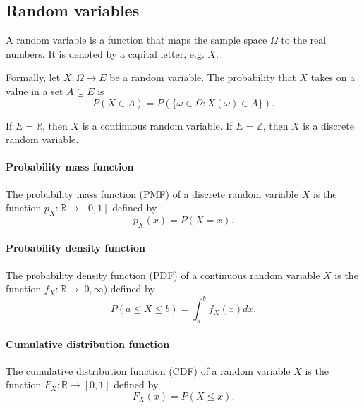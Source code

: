\subsection{Random variables}

A random variable is a function that maps the sample space $\Omega$ to the real
numbers.  It is denoted by a capital letter, e.g. $X$.

Formally, let $X : \Omega \rightarrow E$ be a random variable.  The
probability that $X$ takes on a value in a set $A \subseteq E$ is
\begin{equation}
  \label{eq:rv}
  P(X \in A) = P(\{\omega \in \Omega : X(\omega) \in A\})\text{.}
\end{equation}

If $E = \mathbb{R}$, then $X$ is a continuous random variable.  If $E = \mathbb{Z}$,
then $X$ is a discrete random variable.

\paragraph{Probability mass function}

The probability mass function (PMF) of a discrete random variable $X$ is the
function $p_X : \mathbb{R} \rightarrow [0, 1]$ defined by
\begin{equation}
  \label{eq:pmf}
  p_X(x) = P(X = x)\text{.}
\end{equation}

\paragraph{Probability density function}

The probability density function (PDF) of a continuous random variable $X$ is the
function $f_X : \mathbb{R} \rightarrow [0, \infty)$ defined by
\begin{equation}
  \label{eq:pdf}
  P(a \leq X \leq b) = \int_a^b f_X(x) dx\text{.}
\end{equation}

\paragraph{Cumulative distribution function}

The cumulative distribution function (CDF) of a random variable $X$ is the function
$F_X : \mathbb{R} \rightarrow [0, 1]$ defined by
\begin{equation}
  \label{eq:cdf}
  F_X(x) = P(X \leq x)\text{.}
\end{equation}

